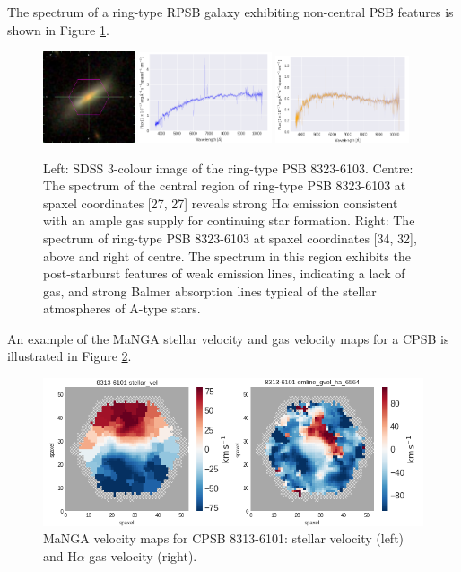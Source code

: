 The spectrum of a ring-type RPSB galaxy exhibiting non-central PSB features is shown in Figure \ref{fig:RPSB-8323-6103-spec}.
\begin{figure}
    \centering
    \includegraphics[width=0.24\textwidth]{images/Cutouts/RPSB-8323-6103-IM.png}
    \hfill
    \includegraphics[width=0.35\textwidth]{images/Spectra/RPSB-8323-6103-27-27.png}
    \hfill
    \includegraphics[width=0.35\textwidth]{images/Spectra/RPSB-8323-6103-34-32.png}
    \caption{Left: SDSS 3-colour image of the ring-type PSB 8323-6103. 
    Centre: The spectrum of the central region of ring-type PSB 8323-6103 at spaxel coordinates [27, 27] reveals strong H$\alpha$ emission consistent with an ample gas supply for continuing star formation.
    Right: The spectrum of ring-type PSB 8323-6103 at spaxel coordinates [34, 32], above and right of centre. The spectrum in this region exhibits the post-starburst features of weak emission lines, indicating a lack of gas, and strong Balmer absorption lines typical of the stellar atmospheres of A-type stars.}
    \label{fig:RPSB-8323-6103-spec}
\end{figure}

An example of the MaNGA stellar velocity and gas velocity maps for a CPSB is illustrated in Figure \ref{fig:CPSB-8313-6101-VMAPS}.

\begin{figure}
    \centering
\includegraphics[width=\columnwidth]{images/VelocityMaps/CPSB-8313-6101-VMAPS.png}
    \caption{MaNGA velocity maps for CPSB 8313-6101: stellar velocity (left) and H$\alpha$ gas velocity (right).}
    \label{fig:CPSB-8313-6101-VMAPS}
\end{figure}

